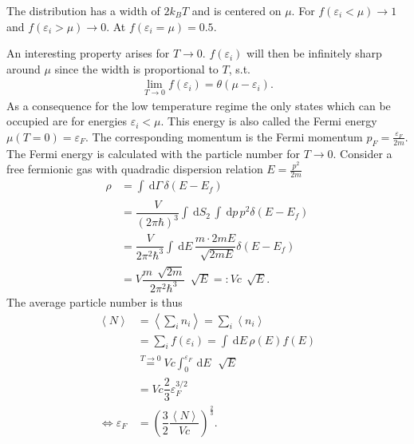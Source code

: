 \documentclass[a4paper,10pt]{article}
\newcommand{\td}{\,\text{d}}
\numberwithin{equation}{section}
\begin{document}
\begin{multicols}{2}
The distribution has a width of $2k_BT$ and is centered on $\mu $.
For $f(\varepsilon _i<\mu )\rightarrow 1$ and $f(\varepsilon _i>\mu )\rightarrow 0$.
At $f(\varepsilon _i=\mu )=0.5$.

An interesting property arises for $T\rightarrow 0$.
$f(\varepsilon _i)$ will then be infinitely sharp around $\mu $ since the width is proportional to $T$, s.t.\ 
\begin{align} 
  \lim_{T\rightarrow 0}f(\varepsilon _i)=\theta (\mu -\varepsilon _i)
.\end{align}
As a consequence for the low temperature regime the only states which can be occupied are for energies $\varepsilon _i<\mu $.
This energy is also called the Fermi energy $\mu (T=0)=\varepsilon _F$.
The corresponding momentum is the Fermi momentum $p_F=\tfrac{\varepsilon _F}{2m}$.
The Fermi energy is calculated with the particle number for $T\rightarrow 0$.
Consider a free fermionic gas with quadradic dispersion relation $E=\tfrac{p^2}{2m}$
\begin{align} 
  \rho  &= \int_{}^{}\td \Gamma \,\delta \left(E-E_f\right)\\
        &= \dfrac{V}{(2\pi \hbar )^3}\int_{}^{}\td S_2\,\int_{}^{}\td p\,p^2\delta (E-E_f)\\
        &= \dfrac{V}{2\pi ^2\hbar ^3}\int_{}^{}\td E\,\dfrac{m\cdot 2mE}{\,\sqrt[]{2mE}}\delta (E-E_f)\\
        &= V\dfrac{m\,\sqrt[]{2m}}{2\pi ^2\hbar ^3}\,\sqrt[]{E} =: Vc \,\sqrt[]{E}
.\end{align} 
The average particle number is thus
\begin{align} 
  \left\langle N\right\rangle &= \left\langle \sum_{i}^{}n_i\right\rangle =\sum_{i}^{}\left\langle n_i\right\rangle \\
                              &= \sum_{i}^{}f(\varepsilon _i) = \int_{}^{}\td E\,\rho (E)f(E)\\
                              &\stackrel{T\rightarrow 0}{=} Vc\int_{0}^{\varepsilon _F}\td E\,\,\sqrt[]{E}\\
                              &= Vc \dfrac{2}{3}\varepsilon _F^{3/2}\\
  \Leftrightarrow \varepsilon _F &= \left(\dfrac{3}{2}\dfrac{\left\langle N\right\rangle }{Vc}\right)^{\tfrac{2}{3}}
.\end{align} 


\end{multicols}
\end{document}
